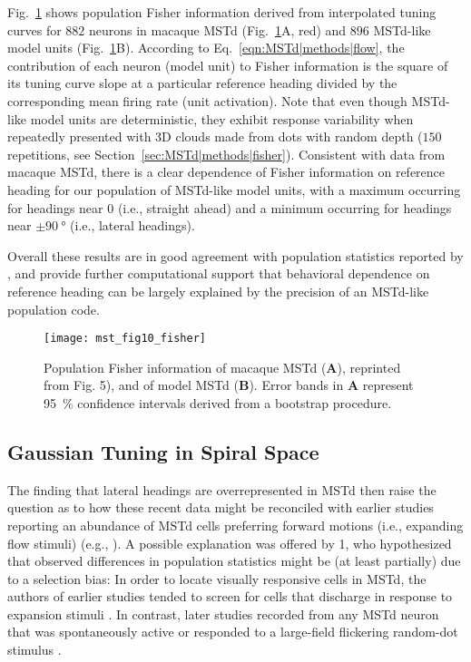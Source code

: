 Fig.~\ref{fig:MSTd|fisher} shows population Fisher information derived from
interpolated tuning curves for $882$ neurons in macaque \ac{MSTd}
(Fig.~\ref{fig:MSTd|fisher}A, red) and $896$ \ac{MSTd}-like model units
(Fig.~\ref{fig:MSTd|fisher}B). According to Eq.~\ref{eqn:MSTd|methods|flow},
the contribution of each neuron (model unit) to Fisher information is the 
square of its tuning curve slope at a particular reference heading divided 
by the corresponding mean firing rate (unit activation). Note that even 
though \ac{MSTd}-like model units are deterministic, they exhibit response
variability when repeatedly presented with 3D clouds made from dots with 
random depth ($150$ repetitions, see Section~\ref{sec:MSTd|methods|fisher}).
Consistent with data from macaque \ac{MSTd}, there is a clear dependence of
Fisher information on reference heading for our population of \ac{MSTd}-like
model units, with a maximum occurring for headings near $0$ (i.e., straight 
ahead) and a minimum occurring for headings near $\pm \SI{90}{\degree}$
(i.e., lateral headings).

Overall these results are in good agreement with population statistics 
reported by \cite{Gu2010}, and provide further computational support that
behavioral dependence on reference heading can be largely explained by the 
precision of an \ac{MSTd}-like population code. 

\begin{figure}[t]
  \centering
  \texttt{[image: mst\_fig10\_fisher]}
  \caption{
  Population Fisher information of macaque \ac{MSTd} (\textbf{A}), 
  reprinted from \cite{Gu2010} Fig. 5), and of model \ac{MSTd} (\textbf{B}).
  Error bands in \textbf{A} represent \SI{95}{\percent} confidence 
  intervals derived from a bootstrap procedure.}
  \label{fig:MSTd|fisher}
\end{figure}


\subsection{Gaussian Tuning in Spiral Space}
\label{sec:MSTd|results|spiralspace}
The finding that lateral headings are overrepresented in \ac{MSTd}
\citep{Gu2006,Takahashi2007,Gu2010} then raise the question as to how 
these recent data might be reconciled with earlier studies reporting an 
abundance of \ac{MSTd} cells preferring forward motions (i.e., expanding
flow stimuli) (e.g., \cite{DuffyWurtz1995}). A possible explanation was 
offered by \citep{Gu2010}1, who hypothesized that observed differences in
population statistics might be (at least partially) due to a selection 
bias: In order to locate visually responsive cells in \ac{MSTd}, the authors
of earlier studies tended to screen for cells that discharge in response
to expansion stimuli \citep{DuffyWurtz1991a,Graziano1994,DuffyWurtz1995}.
In contrast, later studies recorded from any \ac{MSTd} neuron that was
spontaneously active or responded to a large-field flickering random-dot 
stimulus \citep{Gu2006,Takahashi2007,Gu2010}.

